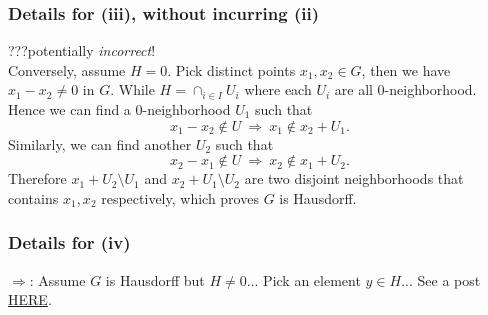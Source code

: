 \subsubsection{Details for (iii), without incurring (ii)}
???potentially \textit{incorrect}!\\ Conversely, assume $H=0$. Pick distinct points $x_1,x_2\in G$, then we have $x_1-x_2\neq 0$ in $G$. 
While $H=\cap_{i\in I} U_i$ where each $U_i$ are all $0$-neighborhood. Hence we can find a $0$-neighborhood $U_1$ such that $$x_1-x_2\notin U ~\Rightarrow~ x_1\notin x_2+U_1.$$ 
Similarly, we can find another $U_2$ such that $$x_2-x_1\notin U ~\Rightarrow~ x_2\notin x_1+U_2.$$
Therefore $x_1+U_2\setminus U_1$ and $x_2+U_1\setminus U_2$ are two disjoint neighborhoods that contains $x_1,x_2$ respectively, which proves $G$ is Hausdorff.

\subsubsection{Details for (iv)}
$\Rightarrow$: Assume $G$ is Hausdorff but $H\neq 0$... Pick an element $y\in H$... See a post \href{URLhttps://math.stackexchange.com/questions/421109/questions-about-the-intersection-of-all-neighborhoods-of-0-in-a-topological-ab}{HERE}. 